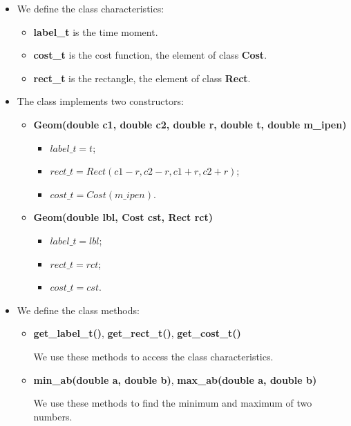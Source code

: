 \documentclass{report}
\begin{document}
	\begin{itemize}
		\item We define the class characteristics: 
		\begin{itemize}
			\item {\bfseries label\_t} is the time moment.
			
			\item {\bfseries cost\_t} is the cost function, the element of class {\bfseries Cost}.
			
			\item {\bfseries rect\_t} is the rectangle, the element of class {\bfseries Rect}.
		\end{itemize}
		
		\item The class implements two constructors:
		\begin{itemize}
			\item {\bfseries Geom(double c1, double c2, double r, double t, double m\_ipen)}
			\begin{itemize}
				\item $label\_t = t$;
				\item $rect\_t = Rect(c1-r, c2-r, c1+r, c2+r)$;
				\item $cost\_t = Cost(m\_ipen)$.
			\end{itemize}
			
			\item {\bfseries Geom(double lbl, Cost cst, Rect rct)}
			\begin{itemize}
				\item $label\_t = lbl$;
				\item $rect\_t = rct$;
				\item $cost\_t = cst$.
			\end{itemize}	
		\end{itemize}
		
		\item We define the class methods:
		
		\begin{itemize}
			\item {\bfseries get\_label\_t()}, {\bfseries get\_rect\_t()}, {\bfseries get\_cost\_t()}
			
			We use these  methods to access the class characteristics.
			
			\item {\bfseries min\_ab(double a, double b)}, {\bfseries max\_ab(double a, double b)}
			
			We use these methods to find the minimum and maximum of two numbers. 
			

\end{itemize}
\end{itemize}
\end{document}
